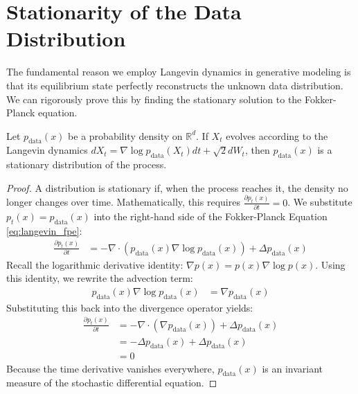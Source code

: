 \section{Stationarity of the Data Distribution}

The fundamental reason we employ Langevin dynamics in generative modeling is that its equilibrium state perfectly reconstructs the unknown data distribution. We can rigorously prove this by finding the stationary solution to the Fokker-Planck equation.

\begin{theorem}
\label{thm:langevin_stationarity}
Let $p_{\text{data}}(x)$ be a probability density on $\mathbb{R}^d$. If $X_t$ evolves according to the Langevin dynamics $dX_t = \nabla \log p_{\text{data}}(X_t) dt + \sqrt{2} dW_t$, then $p_{\text{data}}(x)$ is a stationary distribution of the process.
\end{theorem}

\begin{proof}
A distribution is stationary if, when the process reaches it, the density no longer changes over time. Mathematically, this requires $\frac{\partial p_t(x)}{\partial t} = 0$. We substitute $p_t(x) = p_{\text{data}}(x)$ into the right-hand side of the Fokker-Planck Equation \eqref{eq:langevin_fpe}:
\begin{align*}
    \frac{\partial p_t(x)}{\partial t} &= -\nabla \cdot \left( p_{\text{data}}(x) \nabla \log p_{\text{data}}(x) \right) + \Delta p_{\text{data}}(x)
\end{align*}
Recall the logarithmic derivative identity: $\nabla p(x) = p(x) \nabla \log p(x)$. Using this identity, we rewrite the advection term:
\begin{align*}
    p_{\text{data}}(x) \nabla \log p_{\text{data}}(x) &= \nabla p_{\text{data}}(x)
\end{align*}
Substituting this back into the divergence operator yields:
\begin{align*}
    \frac{\partial p_t(x)}{\partial t} &= -\nabla \cdot \left( \nabla p_{\text{data}}(x) \right) + \Delta p_{\text{data}}(x) \\
    &= -\Delta p_{\text{data}}(x) + \Delta p_{\text{data}}(x) \\
    &= 0
\end{align*}
Because the time derivative vanishes everywhere, $p_{\text{data}}(x)$ is an invariant measure of the stochastic differential equation.
\end{proof}

